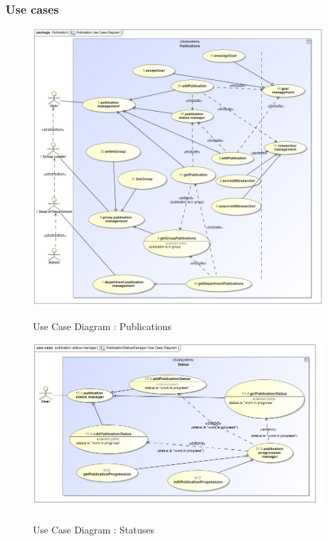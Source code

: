 \documentclass{article}
\begin{document}
	\subsubsection{Use cases} 
		\begin{figure}[H]
		\includegraphics[width=\textwidth]{Quinton_Diagrams/uc__Publication__Publication_Use_Case_Diagram.jpg}  \\
		\caption{Use Case Diagram : Publications}
		\end{figure}

		\begin{figure}[H]
		\includegraphics[width=\textwidth]{Quinton_Diagrams/uc__publication_status_manager__PublicationStatusManager_Use_Case_Diagram.jpg}  \\
		\caption{Use Case Diagram : Statuses}
		\end{figure}
\end{document}
